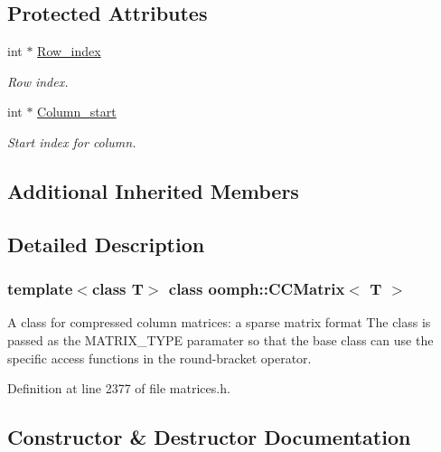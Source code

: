 \subsection*{Protected Attributes}
\begin{DoxyCompactItemize}
\item 
int $\ast$ \hyperlink{classoomph_1_1CCMatrix_a7dba85934f3059d0163dda06f94ddf9b}{Row\+\_\+index}
\begin{DoxyCompactList}\small\item\em Row index. \end{DoxyCompactList}\item 
int $\ast$ \hyperlink{classoomph_1_1CCMatrix_a6a38ae2bd1a69905375585d5b24c6136}{Column\+\_\+start}
\begin{DoxyCompactList}\small\item\em Start index for column. \end{DoxyCompactList}\end{DoxyCompactItemize}
\subsection*{Additional Inherited Members}


\subsection{Detailed Description}
\subsubsection*{template$<$class T$>$\newline
class oomph\+::\+C\+C\+Matrix$<$ T $>$}

A class for compressed column matrices\+: a sparse matrix format The class is passed as the M\+A\+T\+R\+I\+X\+\_\+\+T\+Y\+PE paramater so that the base class can use the specific access functions in the round-\/bracket operator. 

Definition at line 2377 of file matrices.\+h.



\subsection{Constructor \& Destructor Documentation}
\mbox{\label{classoomph_1_1CCMatrix_a16be0ba4cd8d9d5422de26513bab3b41}} 
